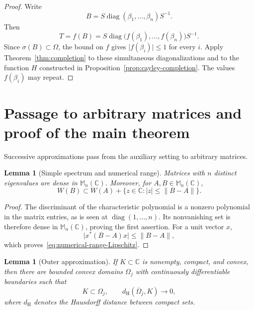 \documentclass[preprints,article,submit,oneauthor]{Definitions/mdpi}
\newcounter{manuscriptresult}[section]
\theoremstyle{mdpi}
\newtheorem{lemma}[manuscriptresult]{Lemma}
\theoremstyle{definition}
\newcommand{\C}{\mathbb C}
\newcommand{\Mn}{\mathbb M_n(\C)}
\newcommand{\diag}{\operatorname{diag}}
\begin{document}
\begin{proof}
Write
\[
  B=S\diag(\beta_1,\ldots,\beta_n)S^{-1}.
\]
Then
\[
  T=f(B)
  =S\diag\bigl(f(\beta_1),\ldots,f(\beta_n)\bigr)S^{-1}.
\]
Since $\sigma(B)\subset\Omega$, the bound on $f$ gives
$\lvert f(\beta_i)\rvert\leq1$ for every $i$.
Apply Theorem~\ref{thm:completion} to these simultaneous
diagonalizations and to the function $H$ constructed in
Proposition~\ref{prop:cayley-completion}.  The values $f(\beta_i)$ may
repeat.
\end{proof}

\section{Passage to arbitrary matrices and proof of the main theorem}
\label{sec:passage}

Successive approximations pass from the auxiliary setting to arbitrary
matrices.

\begin{lemma}[Simple spectrum and numerical range]
\label{lem:simple-spectrum-density}
Matrices with $n$ distinct eigenvalues are dense in $\Mn$.  Moreover,
for $A,B\in\Mn$,
\begin{equation}
  W(B)\subset
  W(A)+\{z\in\C:\lvert z\rvert\leq\lVert B-A\rVert\}.
  \label{eq:numerical-range-Lipschitz}
\end{equation}
\end{lemma}

\begin{proof}
The discriminant of the characteristic polynomial is a nonzero
polynomial in the matrix entries, as is seen at
$\diag(1,\ldots,n)$.  Its nonvanishing set is therefore dense in
$\Mn$, proving the first assertion.  For a unit vector $x$,
\[
  \lvert x^*(B-A)x\rvert\leq\lVert B-A\rVert,
\]
which proves~\eqref{eq:numerical-range-Lipschitz}.
\end{proof}

\begin{lemma}[Outer approximation]
\label{lem:smooth-outer-approximation}
If $K\subset\C$ is nonempty, compact, and convex, then there are
bounded convex domains $\Omega_j$ with continuously differentiable
boundaries such that
\begin{equation}
  K\subset\Omega_j,
  \qquad
  d_{\mathrm H}(\overline\Omega_j,K)\longrightarrow0,
  \label{eq:outer-Hausdorff}
\end{equation}
where $d_{\mathrm H}$ denotes the Hausdorff distance between compact
sets.
\end{lemma}
\end{document}
